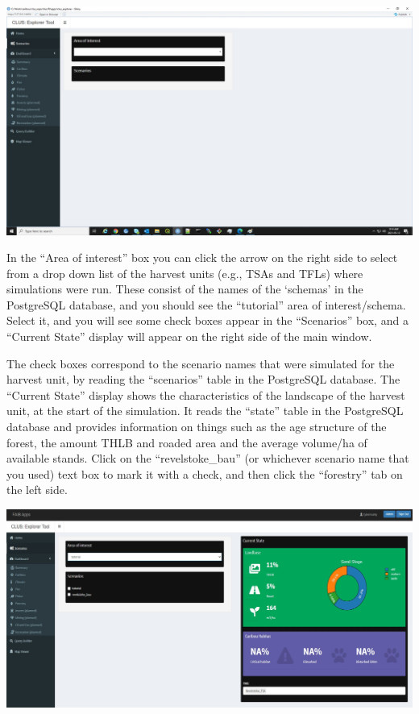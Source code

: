 \documentclass[
]{article}
\begin{document}
\includegraphics{images/clus_explorer_home.jpg}

In the ``Area of interest'' box you can click the arrow on the right
side to select from a drop down list of the harvest units (e.g., TSAs
and TFLs) where simulations were run. These consist of the names of the
`schemas' in the PostgreSQL database, and you should see the
``tutorial'' area of interest/schema. Select it, and you will see some
check boxes appear in the ``Scenarios'' box, and a ``Current State''
display will appear on the right side of the main window.

The check boxes correspond to the scenario names that were simulated for
the harvest unit, by reading the ``scenarios'' table in the PostgreSQL
database. The ``Current State'' display shows the characteristics of the
landscape of the harvest unit, at the start of the simulation. It reads
the ``state'' table in the PostgreSQL database and provides information
on things such as the age structure of the forest, the amount THLB and
roaded area and the average volume/ha of available stands. Click on the
``revelstoke\_bau'' (or whichever scenario name that you used) text box
to mark it with a check, and then click the ``forestry'' tab on the left
side.

\includegraphics{images/clus_explorer_aoi.jpg}
\end{document}
